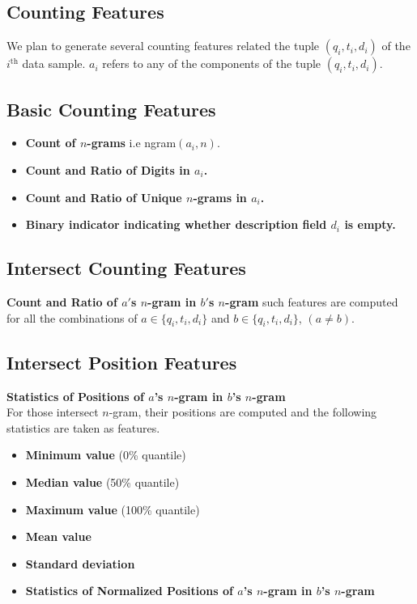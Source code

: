 \documentclass[BTech]{nitkdiss}
\begin{document}
\subsection{Counting Features}
We plan to generate several counting features related the tuple $(q_i, t_i, d_i)$ of the $i^{\textrm{th}}$ data sample. $a_i$ refers to any of the components of the tuple $(q_i, t_i, d_i)$.

\subsection{Basic Counting Features}
\begin{itemize}
\itemsep -1em 
\item \textbf{Count of $n$-grams} i.e ngram$(a_i, n)$.\\
\item \textbf{Count and Ratio of Digits in $a_i$.}\\
\item \textbf{Count and Ratio of Unique $n$-grams in $a_i$.}\\
\item \textbf{Binary indicator indicating whether description field $d_i$ is empty.}
\end{itemize}

\subsection{Intersect Counting Features}
\textbf{Count and Ratio of $a'$s $n$-gram in $b'$s $n$-gram}
such features are computed for all the combinations of $a \in {\{q_i, t_i, d_i\}}$ and $b \in{\{q_i, t_i, d_i\}}$, $(a\neq b)$.

\subsection{Intersect Position Features}
\textbf{Statistics of Positions of $a$'s $n$-gram in $b$'s $n$-gram}\\ For those intersect $n$-gram, their positions are computed and the following statistics are taken as features.\\
\begin{itemize}
 em 
\item \textbf{Minimum value} (0\% quantile)
\item \textbf{Median value} (50\% quantile)
\item \textbf{Maximum value} (100\% quantile)
\item \textbf{Mean value}
\item \textbf{Standard deviation}
\item \textbf{Statistics of Normalized Positions of $a$'s $n$-gram in $b$'s $n$-gram}
\end{itemize}
\end{document}
